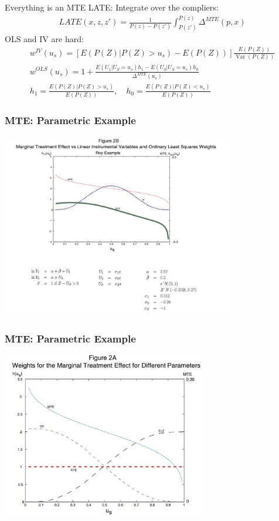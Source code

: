 \documentclass[xcolor=pdftex,dvipsnames,table,mathserif,aspectratio=169]{beamer}
\begin{document}
\begin{frame}{Everything is an MTE}
LATE: Integrate over the compliers:
\begin{eqnarray*}
LATE(x,z,z')= \frac{1}{P(z) - P(z')} \int_{P(z')}^{P(z)} \Delta^{MTE}(p,x) 
\end{eqnarray*}
OLS and IV are hard:
\begin{align*}
w^{I V}\left(u_{s}\right)=\left[E\left(P(Z) | P(Z)>u_{s}\right)-E(P(Z))\right] \frac{E(P(Z))}{\operatorname{Var}(P(Z))}\\
w^{O L S}\left(u_{s}\right)=1+\frac{E\left(U_{1} | U_{S}=u_{s}\right) h_{1}-E\left(U_{0} | U_{S}=u_{s}\right) h_{0}}{\Delta^{M T E}\left(u_{s}\right)}\\
h_{1}=\frac{E\left(P(Z) | P(Z)>u_{s}\right)}{ E(P(Z))}, \quad h_{0}=\frac{E\left(P(Z) | P(Z)<u_{s}\right)}{E(P(Z))}
\end{align*}
\end{frame}

\begin{frame}
\frametitle{MTE: Parametric Example}
\begin{center}
\includegraphics[width=4in]{./resources/mte_plot1.png}
\end{center}
\end{frame}


\begin{frame}
\frametitle{MTE: Parametric Example}
\begin{center}
\includegraphics[width=3.5in]{./resources/mte_plot2.png}
\end{center}
\end{frame}
\end{document}
